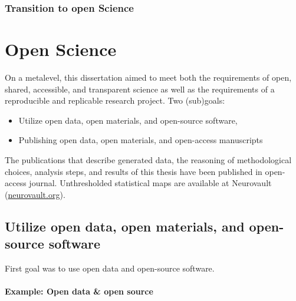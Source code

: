 \subsubsection{Transition to open Science}




\section{Open Science}




On a metalevel, this dissertation aimed to meet both the requirements of open,
shared, accessible, and transparent science \citep[cf.][]{watson2015will,
fecher2014open} as well as the requirements of a reproducible and replicable
research project.
%
Two (sub)goals:

\begin{itemize}
    \item Utilize open data, open materials, and open-source software,
    \item Publishing open data, open materials, and open-access manuscripts
\end{itemize}


The publications that describe generated data, the reasoning of methodological
choices, analysis steps, and results of this thesis have been published in
open-access journal.
%
Unthresholded statistical maps are available at Neurovault
(\href{https://neurovault.org/}{\url{neurovault.org}}).



\subsection{Utilize open data, open materials, and open-source software}

%
First goal was to use open data and open-source software.

\paragraph{Example: Open data \& open source}

